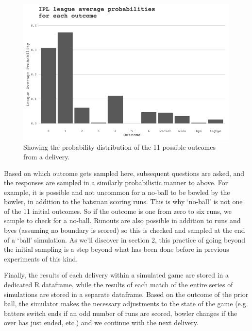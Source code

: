 \begin{figure}
    \centering
    \includegraphics{images/Picture 1.png}
    \caption{Showing the probability distribution of the 11 possible outcomes from a delivery.}
    \label{fig:my_label}
\end{figure}

Based on which outcome gets sampled here, subsequent questions are asked, and the responses are sampled in a similarly probabilistic manner to above. For example, it is possible and not uncommon for a no-ball to be bowled by the bowler, in addition to the batsman scoring runs. This is why ‘no-ball’ is not one of the 11 initial outcomes. So if the outcome is one from zero to six runs, we sample to check for a no-ball. Runouts are also possible in addition to runs and byes (assuming no boundary is scored) so this is checked and sampled at the end of a ‘ball’ simulation. As we’ll discover in section 2, this practice of going beyond the initial sampling is a step beyond what has been done before in previous experiments of this kind.

Finally, the results of each delivery within a simulated game are stored in a dedicated R dataframe, while the results of each match of the entire series of simulations are stored in a separate dataframe. Based on the outcome of the prior ball, the simulator makes the necessary adjustments to the state of the game (e.g. batters switch ends if an odd number of runs are scored, bowler changes if the over has just ended, etc.) and we continue with the next delivery.
